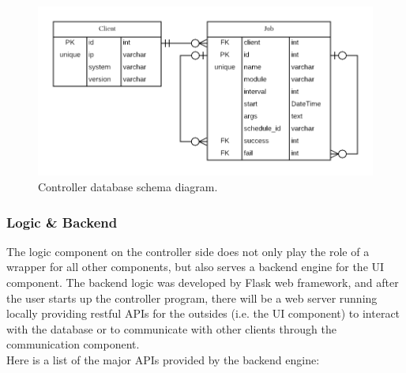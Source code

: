 \documentclass[12pt]{report}
\begin{document}
\begin{figure}[h!]
	\centering
	\includegraphics[width=1\textwidth]{./pictures/db-schema}
	\caption{Controller database schema diagram.}
\end{figure}

\subsubsection{Logic \& Backend}
The logic component on the controller side does not only play the role of a wrapper for all other components, but also serves a backend engine for the UI component. The backend logic was developed by Flask web framework, and after the user starts up the controller program, there will be a web server running locally providing restful APIs for the outsides (i.e. the UI component) to interact with the database or to communicate with other clients through the communication component.\\

Here is a list of the major APIs provided by the backend engine:
\end{document}
